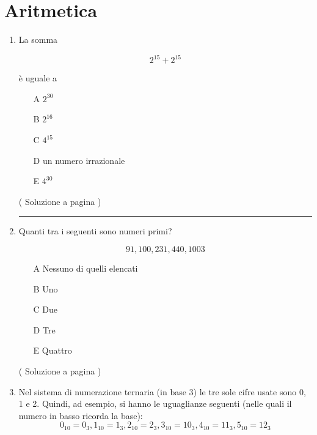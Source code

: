 \section{Aritmetica}\label{sec:aritmetica}

\begin{enumerate}
\item \label{ari_01}

La somma

\begin{equation*}
2^{15} + 2^{15}
\end{equation*}

è uguale a

\begin{itemize}
\item[A] $2^{30}$
\item[B] $2^{16}$
\item[C] $4^{15}$
\item[D] un numero irrazionale
\item[E] $4^{30}$
\end{itemize}

( Soluzione a pagina \pageref{aris_01} )


\vspace{1cm}
\hrule
\vspace{1cm}

\item \label{ari_02}
Quanti tra i seguenti sono numeri primi?

\begin{equation*}
91,  100,  231,  440,  1003
\end{equation*}


\begin{itemize}
\item[A] Nessuno di quelli elencati
\item[B] Uno
\item[C] Due
\item[D] Tre
\item[E] Quattro
\end{itemize}


( Soluzione a pagina \pageref{aris_02} )

\item 
Nel sistema di numerazione ternaria (in base $3$) le tre sole cifre usate sono 0, 1 e 2.
Quindi, ad esempio, si hanno le uguaglianze seguenti (nelle quali il numero in basso ricorda la base):
\begin{equation*}
0_{10} = 0_3 , 1_{10} = 1_3 , 2_{10} = 2_3 ,  3_{10} = 10_3 ,  4_{10} = 11_3 , 5_{10} = 12_3
\end{equation*}


\end{enumerate}
